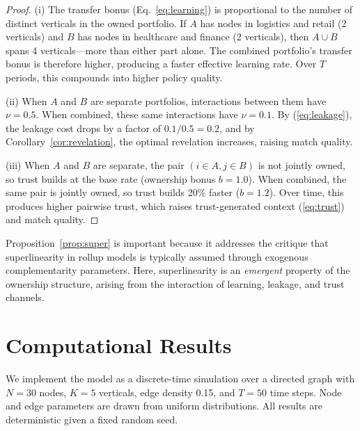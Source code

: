 \documentclass[12pt]{article}
\theoremstyle{definition}
\begin{document}
\begin{proof}
(i) The transfer bonus (Eq.~\ref{eq:learning}) is proportional to the number of distinct verticals in the owned portfolio. If $A$ has nodes in logistics and retail (2 verticals) and $B$ has nodes in healthcare and finance (2 verticals), then $A \cup B$ spans 4 verticals---more than either part alone. The combined portfolio's transfer bonus is therefore higher, producing a faster effective learning rate. Over $T$ periods, this compounds into higher policy quality.

(ii) When $A$ and $B$ are separate portfolios, interactions between them have $\nu = 0.5$. When combined, these same interactions have $\nu = 0.1$. By (\ref{eq:leakage}), the leakage cost drops by a factor of $0.1/0.5 = 0.2$, and by Corollary~\ref{cor:revelation}, the optimal revelation increases, raising match quality.

(iii) When $A$ and $B$ are separate, the pair $(i \in A, j \in B)$ is not jointly owned, so trust builds at the base rate (ownership bonus $b = 1.0$). When combined, the same pair is jointly owned, so trust builds 20\% faster ($b = 1.2$). Over time, this produces higher pairwise trust, which raises trust-generated context (\ref{eq:trust}) and match quality.
\end{proof}

\begin{remark}
Proposition~\ref{prop:super} is important because it addresses the critique that superlinearity in rollup models is typically assumed through exogenous complementarity parameters. Here, superlinearity is an \textit{emergent} property of the ownership structure, arising from the interaction of learning, leakage, and trust channels.
\end{remark}

\section{Computational Results}

We implement the model as a discrete-time simulation over a directed graph with $N = 30$ nodes, $K = 5$ verticals, edge density 0.15, and $T = 50$ time steps. Node and edge parameters are drawn from uniform distributions. All results are deterministic given a fixed random seed.
\end{document}
